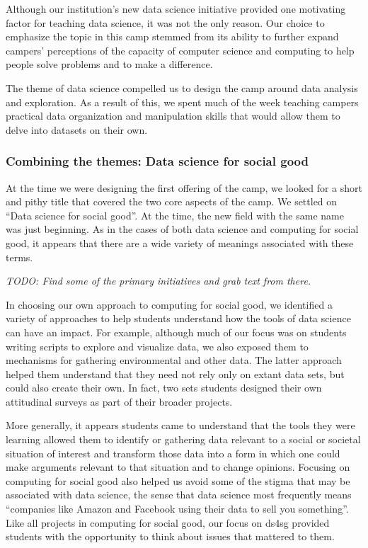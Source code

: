 Although our institution's new data science initiative provided one
motivating factor for teaching data science, it was not the only
reason.  Our choice to emphasize the topic in this camp stemmed
from its ability to further expand campers' perceptions of the
capacity of computer science and computing to help people solve problems
and to make a difference.

The theme of data science compelled us to design the camp around
data analysis and exploration. As a result of this, we spent much
of the week teaching campers practical data organization and
manipulation skills that would allow them to delve into datasets
on their own.

\subsubsection{Combining the themes: Data science for social good}

At the time we were designing the first offering of the camp, we looked
for a short and pithy title that covered the two core aspects of the camp.
We settled on ``Data science for social good''.  At the time, the
new field with the same name was just beginning.  As in the cases of
both data science and computing for social good, it appears that there
are a wide variety of meanings associated with these terms.

\textit{TODO: Find some of the primary initiatives and grab 
text from there.}

In choosing our own approach to computing for social good, we
identified a variety of approaches to help students understand how
the tools of data science can have an impact.  For example, although 
much of our focus was on students writing scripts to explore and
visualize data, we also exposed them to mechanisms for gathering
environmental and other data.  The latter approach helped them understand
that they need not rely only on extant data sets, but could also
create their own.  In fact, two sets students designed their own attitudinal
surveys as part of their broader projects.

More generally, it appears students came to understand that the
tools they were learning allowed them to identify or gathering data
relevant to a social or societal situation of interest and transform
those data into a form in which one could make arguments relevant
to that situation and to change opinions.  Focusing on computing
for social good also helped us avoid some of the stigma that may
be associated with data science, the sense that data science most
frequently means ``companies like Amazon and Facebook using their
data to sell you something''.  Like all projects in computing for
social good, our focus on ds4sg provided students with the opportunity
to think about issues that mattered to them.

